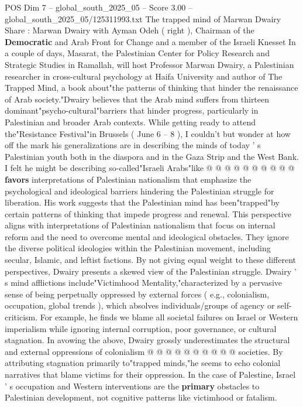 \begin{textsample}{POS Dim 7 – global\_south\_2025\_05 – Score 3.00 – global\_south\_2025\_05/125311993.txt}  \label{ex:f7_pos_444}
The trapped mind of Marwan Dwairy Share : Marwan Dwairy with Ayman Odeh ( right ), Chairman of the \textbf{Democratic} and Arab Front for Change and a member of the Israeli Knesset In a couple of days, Masarat, the Palestinian Center for Policy Research and Strategic Studies in Ramallah, will host Professor Marwan Dwairy, a Palestinian researcher in cross-cultural psychology at Haifa University and author of The Trapped Mind, a book about"the patterns of thinking that hinder the renaissance of Arab society."Dwairy believes that the Arab mind suffers from thirteen dominant"psycho-cultural"barriers that hinder progress, particularly in Palestinian and broader Arab contexts.
While getting ready to attend the"Resistance Festival"in Brussels ( June 6 -- 8 ), I couldn't but wonder at how off the mark his generalizations are in describing the minds of today ' s Palestinian youth both in the diaspora and in the Gaza Strip and the West Bank.
I felt he might be describing so-called"Israeli Arabs"like @ @ @ @ @ @ @ @ @ @ \textbf{favors} interpretations of Palestinian nationalism that emphasize the psychological and ideological barriers hindering the Palestinian struggle for liberation.
His work suggests that the Palestinian mind has been"trapped"by certain patterns of thinking that impede progress and renewal.
This perspective aligns with interpretations of Palestinian nationalism that focus on internal reform and the need to overcome mental and ideological obstacles.
They ignore the diverse political ideologies within the Palestinian movement, including secular, Islamic, and leftist factions.
By not giving equal weight to these different perspectives, Dwairy presents a skewed view of the Palestinian struggle.
Dwairy ' s mind afflictions include"Victimhood Mentality,"characterized by a pervasive sense of being perpetually oppressed by external forces ( e.g., colonialism, occupation, global trends ), which absolves individuals/groups of agency or self-criticism.
For example, he finds we blame all societal failures on Israel or Western imperialism while ignoring internal corruption, poor governance, or cultural stagnation.
In avowing the above, Dwairy grossly underestimates the structural and external oppressions of colonialism @ @ @ @ @ @ @ @ @ @ societies.
By attributing stagnation primarily to"trapped minds,"he seems to echo colonial narratives that blame victims for their oppression.
In the case of Palestine, Israel ' s occupation and Western interventions are the \textbf{primary} obstacles to Palestinian development, not cognitive patterns like victimhood or fatalism.

\end{textsample}
